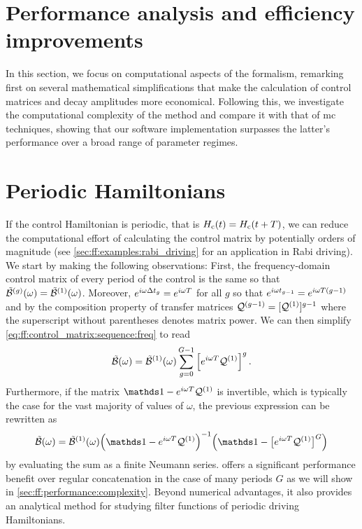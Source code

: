 \section{Performance analysis and efficiency improvements}\label{sec:ff:performance}
In this section, we focus on computational aspects of the formalism, remarking first on several mathematical simplifications that make the calculation of control matrices and decay amplitudes more economical.
Following this, we investigate the computational complexity of the method and compare it with that of \gls{mc} techniques, showing that our software implementation surpasses the latter's performance over a broad range of parameter regimes.

\section{Periodic Hamiltonians}\label{sec:ff:performance:periodic_hamiltonians}
If the control Hamiltonian is periodic, that is $H_{\mathrm{c}}(t) = H_{\mathrm{c}}(t + T)$, we can reduce the computational effort of calculating the control matrix by potentially orders of magnitude (see \cref{sec:ff:examples:rabi_driving} for an application in Rabi driving).
We start by making the following observations: First, the frequency-domain control matrix of every period of the control is the same so that $\tilde{\mathcal{B}}^{(g)}(\omega) = \tilde{\mathcal{B}}^{(1)}(\omega)$.
Moreover, $e^{i\omega\Delta t_g} = e^{i\omega T}$ for all $g$ so that $e^{i\omega t_{g-1}} = e^{i\omega T(g - 1)}$ and by the composition property of transfer matrices $\mathcal{Q}^{(g-1)} = [\mathcal{Q}^{(1)}]^{g-1}$ where the superscript without parentheses denotes matrix power.
We can then simplify \cref{eq:ff:control_matrix:sequence:freq} to read
\begin{equation}\label{eq:ff:control_matrix:sequence:periodic:explicit}
    \tilde{\mathcal{B}}(\omega) = \tilde{\mathcal{B}}^{(1)}(\omega)\sum_{g=0}^{G-1}\left[e^{i\omega T}\mathcal{Q}^{(1)}\right]^g.
\end{equation}
Furthermore, if the matrix $\eye - \e^{\i\omega T}\liouvQ\gth{1}$ is invertible, which is typically the case for the vast majority of values of $\omega$, the previous expression can be rewritten as
\begin{equation}\label{eq:ff:control_matrix:sequence:periodic:simplified}
    \ctrlmat(\omega) = \ctrlmat\gth{1}(\omega)\Bigl(\eye - \e^{\i\omega T}\liouvQ\gth{1}\Bigr)^{-1}
        \Bigl(\eye - \bigl[\e^{\i\omega T}\liouvQ\gth{1}\bigr]^G\Bigr)
\end{equation}
by evaluating the sum as a finite Neumann series.
 offers a significant performance benefit over regular concatenation in the case of many periods $G$ as we will show in \cref{sec:ff:performance:complexity}.
Beyond numerical advantages, it also provides an analytical method for studying filter functions of periodic driving Hamiltonians.

